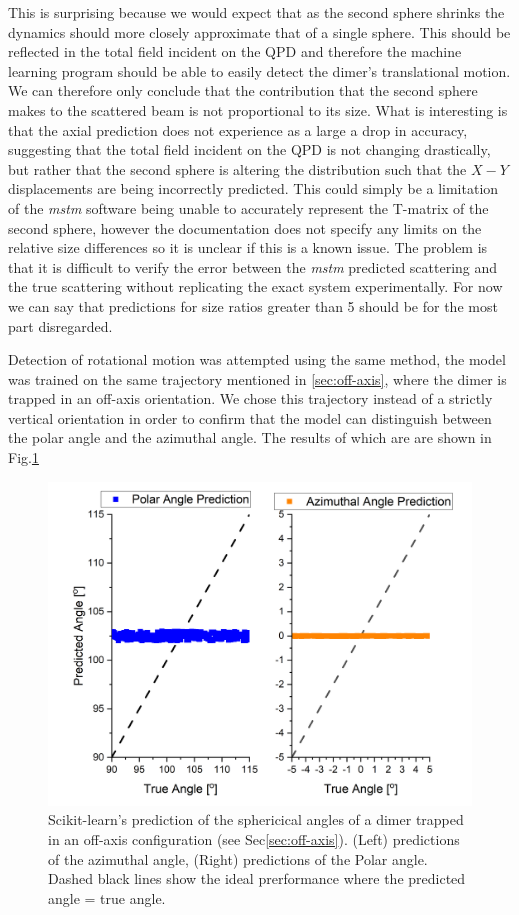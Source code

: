 This is surprising because we would expect that as the second 
sphere shrinks the dynamics should more closely approximate that 
of a single sphere. This should be reflected in the total field
incident on the QPD and therefore the machine learning program 
should be able to easily detect the dimer's translational motion.
We can therefore only conclude that the contribution that the 
second sphere makes to the scattered beam is not proportional to
its size. What is interesting is that the axial prediction does 
not experience as a large a drop in accuracy, suggesting that the
total field incident on the QPD is not changing drastically, but
rather that the second sphere is altering the distribution such
that the $X-Y$ displacements are being incorrectly predicted. 
This could simply be a limitation of the \textit{mstm} software being 
unable to accurately represent the T-matrix of the second sphere, 
however the documentation does not specify any limits on the relative 
size differences so it is unclear if this is a known issue. The 
problem is that it is difficult to verify the error between the 
\textit{mstm} predicted scattering and the true scattering without 
replicating the exact system experimentally. For now we can say that predictions for size ratios greater than 5 should be for the most 
part disregarded. 

Detection of rotational motion was attempted using the same method, 
the model was trained on the same trajectory mentioned in 
\ref{sec:off-axis}, where the dimer is trapped in an off-axis 
orientation. We chose this trajectory instead of a strictly vertical
orientation in order to confirm that the model can distinguish between 
the polar angle and the azimuthal angle. The results of which are 
are shown in Fig.\ref{fig:predicted_rotations}
\begin{figure}[h!]
	\centering
	\includegraphics[width=\linewidth]{angular_predictions.png}
	\caption{Scikit-learn's prediction of the sphericical angles of
	a dimer trapped in an off-axis configuration (see Sec\ref{sec:off-axis}).
	(Left) predictions of the azimuthal angle, (Right) predictions 
	of the Polar angle. Dashed black lines show the ideal prerformance 
	where the predicted angle = true angle.}
	\label{fig:predicted_rotations}
\end{figure}

